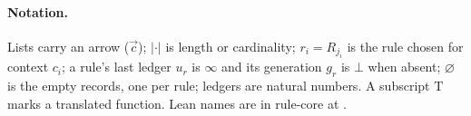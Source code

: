 \paragraph{Notation.} Lists carry an arrow ($\vec c$); $|\cdot|$ is length or
cardinality; $r_i = R_{j_i}$ is the rule chosen for context $c_i$; a rule's last
ledger $u_r$ is $\infty$ and its generation $g_r$ is $\bot$ when absent;
$\varnothing$ is the empty records, one per rule; ledgers are natural numbers. A
subscript $\mathrm{T}$ marks a translated function. Lean names are in rule-core
at .


